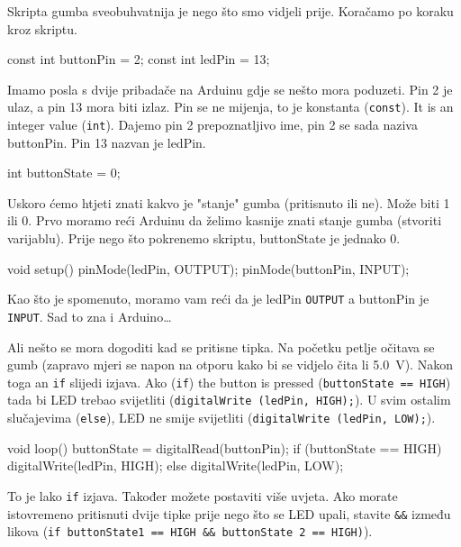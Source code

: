 \documentclass{arduino}
\begin{document}
Skripta gumba sveobuhvatnija je nego što smo vidjeli prije. Koračamo po koraku kroz skriptu.

\begin{marginlisting}
const int buttonPin = 2;
const int ledPin = 13;
\end{marginlisting}

Imamo posla s dvije pribadače na Arduinu gdje se nešto mora poduzeti. Pin 2 je ulaz, a pin 13 mora biti izlaz. Pin se ne mijenja, to je konstanta (\lstinline{const}). It is an integer value (\lstinline{int}). Dajemo pin 2 prepoznatljivo ime, pin 2 se sada naziva buttonPin. Pin 13 nazvan je ledPin.

\begin{marginlisting}
int buttonState = 0;
\end{marginlisting}

Uskoro ćemo htjeti znati kakvo je "stanje" gumba (pritisnuto ili ne). Može biti 1 ili 0. Prvo moramo reći Arduinu da želimo kasnije znati stanje gumba (stvoriti varijablu). Prije nego što pokrenemo skriptu, buttonState je jednako 0.

\begin{marginlisting}
void setup() {
  pinMode(ledPin, OUTPUT);
  pinMode(buttonPin, INPUT);
}
\end{marginlisting}

Kao što je spomenuto, moramo vam reći da je ledPin \lstinline{OUTPUT} a buttonPin je \lstinline{INPUT}. Sad to zna i Arduino\dots

Ali nešto se mora dogoditi kad se pritisne tipka. Na početku petlje očitava se gumb (zapravo mjeri se napon na otporu kako bi se vidjelo čita li \SI{5.0}{\volt}). Nakon toga an \lstinline{if} slijedi izjava. Ako (\lstinline{if}) the button is pressed (\lstinline{buttonState == HIGH}) tada bi LED trebao svijetliti (\lstinline{digitalWrite (ledPin, HIGH);}). U svim ostalim slučajevima (\lstinline{else}), LED ne smije svijetliti (\lstinline{digitalWrite (ledPin, LOW);}).

\begin{marginlisting}
void loop() {
  buttonState = digitalRead(buttonPin);
  if (buttonState == HIGH) {
    digitalWrite(ledPin, HIGH);
  }
  else {
    digitalWrite(ledPin, LOW);
  }
}
\end{marginlisting}

To je lako \lstinline{if} izjava. Također možete postaviti više uvjeta. Ako morate istovremeno pritisnuti dvije tipke prije nego što se LED upali, stavite \lstinline{&&} između likova (\lstinline{if buttonState1 == HIGH && buttonState 2 == HIGH)}).
\end{document}
